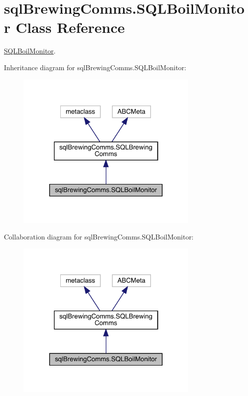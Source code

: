 \hypertarget{classsql_brewing_comms_1_1_s_q_l_boil_monitor}{}\section{sql\+Brewing\+Comms.\+S\+Q\+L\+Boil\+Monitor Class Reference}
\label{classsql_brewing_comms_1_1_s_q_l_boil_monitor}


\mbox{\hyperlink{classsql_brewing_comms_1_1_s_q_l_boil_monitor}{S\+Q\+L\+Boil\+Monitor}}.  




Inheritance diagram for sql\+Brewing\+Comms.\+S\+Q\+L\+Boil\+Monitor\+:\nopagebreak
\begin{figure}[H]
\begin{center}
\leavevmode
\includegraphics[width=252pt]{classsql_brewing_comms_1_1_s_q_l_boil_monitor__inherit__graph}
\end{center}
\end{figure}


Collaboration diagram for sql\+Brewing\+Comms.\+S\+Q\+L\+Boil\+Monitor\+:\nopagebreak
\begin{figure}[H]
\begin{center}
\leavevmode
\includegraphics[width=252pt]{classsql_brewing_comms_1_1_s_q_l_boil_monitor__coll__graph}
\end{center}
\end{figure}

